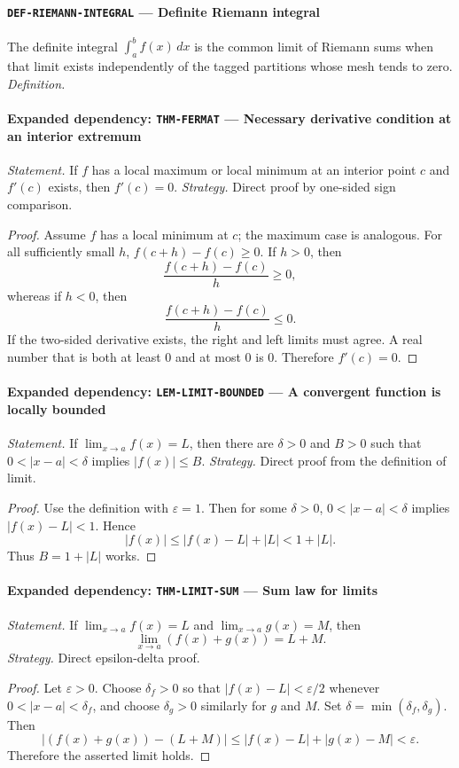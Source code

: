 \documentclass[10pt]{article}
\newcommand{\pidraw}[1]{\begingroup\urlstyle{tt}\nolinkurl{#1}\endgroup}
\theoremstyle{definition}
\theoremstyle{remark}
\begin{document}
\paragraph{\pidraw{DEF-RIEMANN-INTEGRAL} --- Definite Riemann integral}
The definite integral $\int_a^b f(x)\,dx$ is the common limit of Riemann sums when that limit exists independently of the tagged partitions whose mesh tends to zero.
\textit{Definition.}

\paragraph{Expanded dependency: \pidraw{THM-FERMAT} --- Necessary derivative condition at an interior extremum}
\textit{Statement.} If $f$ has a local maximum or local minimum at an interior point $c$ and $f'(c)$ exists, then $f'(c)=0$.
\textit{Strategy.} Direct proof by one-sided sign comparison.
\begin{proof}Assume $f$ has a local minimum at $c$; the maximum case is analogous.
For all sufficiently small $h$,
$f(c+h)-f(c)\ge0$. If $h>0$, then
\[
\frac{f(c+h)-f(c)}{h}\ge0,
\]
whereas if $h<0$, then
\[
\frac{f(c+h)-f(c)}{h}\le0.
\]
If the two-sided derivative exists, the right and left limits must agree.
A real number that is both at least $0$ and at most $0$ is $0$.
Therefore $f'(c)=0$.\end{proof}

\paragraph{Expanded dependency: \pidraw{LEM-LIMIT-BOUNDED} --- A convergent function is locally bounded}
\textit{Statement.} If $\lim_{x\to a}f(x)=L$, then there are $\delta>0$ and $B>0$ such that
$0<|x-a|<\delta$ implies $|f(x)|\le B$.
\textit{Strategy.} Direct proof from the definition of limit.
\begin{proof}Use the definition with $\varepsilon=1$. Then for some $\delta>0$,
$0<|x-a|<\delta$ implies $|f(x)-L|<1$. Hence
\[
|f(x)|\le |f(x)-L|+|L|<1+|L|.
\]
Thus $B=1+|L|$ works.\end{proof}

\paragraph{Expanded dependency: \pidraw{THM-LIMIT-SUM} --- Sum law for limits}
\textit{Statement.} If $\lim_{x\to a}f(x)=L$ and $\lim_{x\to a}g(x)=M$, then
\[
\lim_{x\to a}(f(x)+g(x))=L+M.
\]
\textit{Strategy.} Direct epsilon-delta proof.
\begin{proof}Let $\varepsilon>0$. Choose $\delta_f>0$ so that
$|f(x)-L|<\varepsilon/2$ whenever $0<|x-a|<\delta_f$, and choose
$\delta_g>0$ similarly for $g$ and $M$. Set
$\delta=\min(\delta_f,\delta_g)$. Then
\[
|(f(x)+g(x))-(L+M)|
\le |f(x)-L|+|g(x)-M|<\varepsilon.
\]
Therefore the asserted limit holds.\end{proof}
\end{document}
